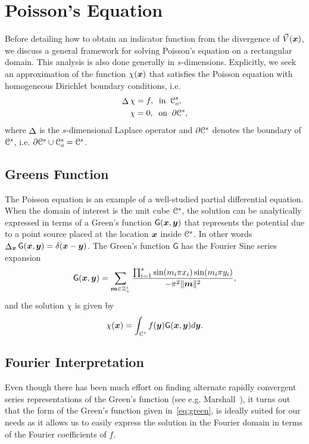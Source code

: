 \section{Poisson's Equation} 
Before detailing how to obtain an indicator function from the divergence of $\vec{V}(\boldsymbol{x})$, we discuss a general framework for solving Poisson's equation on a rectangular domain. 
This analysis is also done generally in $s$-dimensions.
Explicitly, we seek an approximation of the function $\chi(\boldsymbol{x})$ that satisfies the Poisson equation with homogeneous Dirichlet boundary conditions, i.e. 
\begin{equation} \label{eq:PoissonEquation}
	\begin{split}
		\laplacian{\chi} &= f, \;\; \text{in} \;\; \oucube^s, \\
		\chi &= 0, \;\; \text{on} \;\; \partial \ucube^s,
	\end{split}
\end{equation}
where $\mathop{\Delta}$ is the $s$-dimensional Laplace operator and $\partial \mathcal{C}^s$ denotes the boundary of $\mathcal{C}^s$, i.e. $\partial \mathcal{C}^s \cup \mathcal{C}_o^s = \mathcal{C}^s$.

\subsection{Greens Function}
The Poisson equation is an example of a well-studied partial differential equation. 
When the domain of interest is the unit cube $\mathcal{C}^s$, the solution can be analytically expressed in terms of a Green's function $\mathsf{G}(\boldsymbol{x},\boldsymbol{y})$ that represents the potential due to a point source placed at the location $\boldsymbol{x}$ inside $\mathcal{C}^s$.  
In other words $\mathop{\Delta}_{\boldsymbol{x}} \mathsf{G}(\boldsymbol{x},\boldsymbol{y}) = \delta(\boldsymbol{x}-\boldsymbol{y})$. The Green's function $\mathsf{G}$ has the Fourier Sine series expansion 
\begin{equation}
	\mathsf{G}(\vect{x},\vect{y}) = \sum_{\vect{m} \in \ints^s_+} 
	\frac{\prod_{i=1}^s \sin(m_i \pi x_i) \sin(m_i \pi y_i)}
	{-\pi^2 \norm{\vect{m}}^2},
	\label{eq:green}
\end{equation}
and the solution $\chi$ is given by
\begin{equation}
	\chi(\vect{x}) = \int_{\ucube^s}f(\vect{y})\mathsf{G}(\vect{x},\vect{y}) d\vect{y}.
	\label{eq:analytic}
\end{equation}


\subsection{Fourier Interpretation}
Even though there has been much effort on finding alternate rapidly convergent series representations of the Green's function (see e.g. Marshall~\cite{marshall99}), it turns out that the form of the Green's function given in~\eqref{eq:green}, is ideally suited for our needs as it allows us to easily express the solution in the Fourier domain in terms of the Fourier coefficients of $f$.

